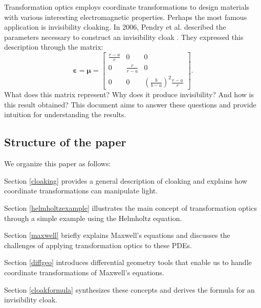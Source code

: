 Transformation optics employs coordinate transformations to design materials with
various interesting electromagnetic properties. Perhaps the most famous
application is invisibility cloaking. In 2006, Pendry et al. described the
parameters necessary to construct an invisibility cloak
\cite{pendryControllingElectromagneticFields2006}. They
expressed this description through the matrix:
\begin{equation*}
\boldsymbol{\varepsilon}
=\boldsymbol{\mu}=
\begin{bmatrix}
\frac{r-a}{r} & 0 & 0\\
0 & \frac{r}{r-a} & 0\\
0 & 0 & \left(\frac{b}{b-a}\right)^2 \frac{r-a}{r}
\end{bmatrix}.
\end{equation*}
What does this matrix represent? Why does it produce invisibility?
And how is this result obtained?
This document aims to answer these questions and provide intuition
for understanding the results.

\subsection{Structure of the paper}
We organize this paper as follows:

Section \ref{cloaking} provides a
general description of cloaking and explains how coordinate transformations can
manipulate light.

Section \ref{helmholtzexample} illustrates the main concept of
transformation optics through a simple example using the Helmholtz equation.

Section \ref{maxwell} briefly explains Maxwell's equations and discusses the
challenges of applying transformation optics to these PDEs.

Section \ref{diffgeo} introduces differential geometry tools that enable us to
handle coordinate transformations of Maxwell's equations.

Section \ref{cloakformula} synthesizes these concepts and derives
the formula for an invisibility cloak.
